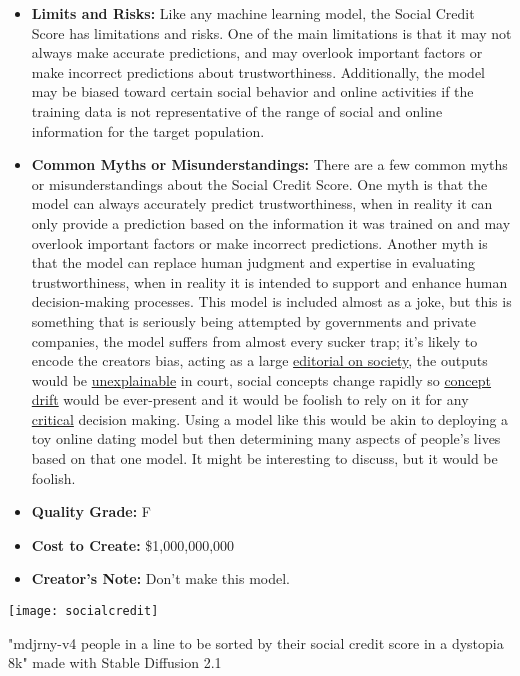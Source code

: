 \begin{itemize}
\begin{enumerate}
        \end{enumerate}
    \item \textbf{Limits and Risks:} Like any machine learning model, the Social Credit Score has limitations and risks. One of the main limitations is that it may not always make accurate predictions, and may overlook important factors or make incorrect predictions about trustworthiness. Additionally, the model may be biased toward certain social behavior and online activities if the training data is not representative of the range of social and online information for the target population.
    \item \textbf{Common Myths or Misunderstandings:} There are a few common myths or misunderstandings about the Social Credit Score. One myth is that the model can always accurately predict trustworthiness, when in reality it can only provide a prediction based on the information it was trained on and may overlook important factors or make incorrect predictions. Another myth is that the model can replace human judgment and expertise in evaluating trustworthiness, when in reality it is intended to support and enhance human decision-making processes. This model is included almost as a joke, but this is something that is seriously being attempted by governments and private companies, the model suffers from almost every sucker trap; it's likely to encode the creators bias, acting as a large \hyperref[sec:janitor]{editorial on society}, the outputs would be \hyperref[sec:explain]{unexplainable} in court, social concepts change rapidly so \hyperref[sec:drift]{concept drift} would be ever-present and it would be foolish to rely on it for any \hyperref[sec:creative]{critical} decision making. Using a model like this would be akin to deploying a toy online dating model but then determining many aspects of people's lives based on that one model. It might be interesting to discuss, but it would be foolish.
    \item \textbf{Quality Grade:} F
    \item \textbf{Cost to Create:} \$1,000,000,000
    \item \textbf{Creator's Note:} Don't make this model.
\end{itemize}

\begin{pdf}
\begin{marginfigure}[-5.5cm]
        \texttt{[image: socialcredit]}
        \caption{"mdjrny-v4 people in a line to be sorted by their social credit score in a dystopia 8k" made with Stable Diffusion 2.1}
\end{marginfigure}
\end{pdf}


